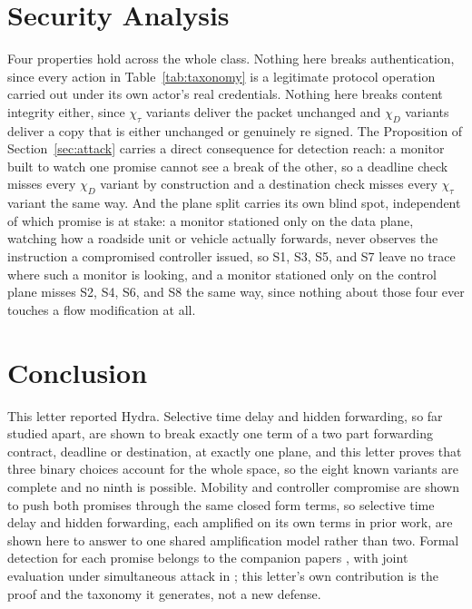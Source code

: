 \documentclass[lettersize,journal]{IEEEtran}
\begin{document}
\section{Security Analysis}
\label{sec:security}
Four properties hold across the whole class. Nothing here breaks authentication, since every action in Table~\ref{tab:taxonomy} is a legitimate protocol operation carried out under its own actor's real credentials. Nothing here breaks content integrity either, since $\chi_\tau$ variants deliver the packet unchanged and $\chi_D$ variants deliver a copy that is either unchanged or genuinely re signed. The Proposition of Section~\ref{sec:attack} carries a direct consequence for detection reach: a monitor built to watch one promise cannot see a break of the other, so a deadline check misses every $\chi_D$ variant by construction and a destination check misses every $\chi_\tau$ variant the same way. And the plane split carries its own blind spot, independent of which promise is at stake: a monitor stationed only on the data plane, watching how a roadside unit or vehicle actually forwards, never observes the instruction a compromised controller issued, so S1, S3, S5, and S7 leave no trace where such a monitor is looking, and a monitor stationed only on the control plane misses S2, S4, S6, and S8 the same way, since nothing about those four ever touches a flow modification at all.

\section{Conclusion}
This letter reported Hydra. Selective time delay and hidden forwarding, so far studied apart, are shown to break exactly one term of a two part forwarding contract, deadline or destination, at exactly one plane, and this letter proves that three binary choices account for the whole space, so the eight known variants are complete and no ninth is possible. Mobility and controller compromise are shown to push both promises through the same closed form terms, so selective time delay and hidden forwarding, each amplified on its own terms in prior work, are shown here to answer to one shared amplification model rather than two. Formal detection for each promise belongs to the companion papers \cite{phantom2026,vanguardhf2026}, with joint evaluation under simultaneous attack in \cite{nexus2026}; this letter's own contribution is the proof and the taxonomy it generates, not a new defense.
\end{document}
